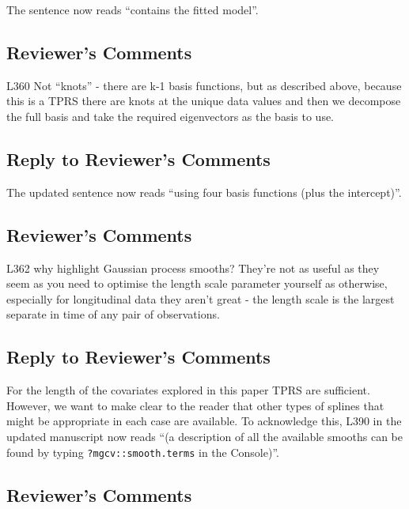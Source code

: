 \documentclass[
]{article}
\newcommand{\passthrough}[1]{#1}
\begin{document}
The sentence now reads ``contains the fitted model''.

\hypertarget{reviewers-comments-26}{%
\subsection{Reviewer's Comments}\label{reviewers-comments-26}}

L360 Not ``knots'' - there are k-1 basis functions, but as described above, because this is a TPRS there are knots at the unique data values and then we decompose the full basis and take the required eigenvectors as the basis to use.

\hypertarget{section-27}{%
\subsection{\texorpdfstring{\textcolor{reviewersblue} {Reply to Reviewer's Comments}}{}}\label{section-27}}

The updated sentence now reads ``using four basis functions (plus the intercept)''.

\hypertarget{reviewers-comments-27}{%
\subsection{Reviewer's Comments}\label{reviewers-comments-27}}

L362 why highlight Gaussian process smooths? They're not as useful as they seem as you need to optimise the length scale parameter yourself as otherwise, especially for longitudinal data they aren't great - the length scale is the largest separate in time of any pair of observations.

\hypertarget{section-28}{%
\subsection{\texorpdfstring{\textcolor{reviewersblue} {Reply to Reviewer's Comments}}{}}\label{section-28}}

For the length of the covariates explored in this paper TPRS are sufficient. However, we want to make clear to the reader that other types of splines that might be appropriate in each case are available. To acknowledge this, L390 in the updated manuscript now reads ``(a description of all the available smooths can be found by typing \passthrough{\lstinline!?mgcv::smooth.terms!} in the Console)''.

\hypertarget{reviewers-comments-28}{%
\subsection{Reviewer's Comments}\label{reviewers-comments-28}}
\end{document}
